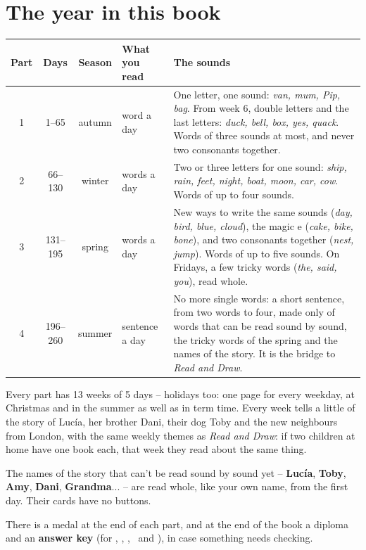 \section*{The year in this book}

\begin{center}
\renewcommand{\arraystretch}{1.4}
\begin{tabularx}{\linewidth}{@{}c c c >{\raggedright\arraybackslash}p{27mm} >{\raggedright\arraybackslash}X@{}}
\toprule
\textbf{Part} & \textbf{Days} & \textbf{Season} & \textbf{What you read} & \textbf{The sounds} \\
\midrule
1 & 1--65    & autumn & 1 word a day     & One letter, one sound: \textit{van, mum, Pip, bag}. From week 6,
double letters and the last letters: \textit{duck, bell, box, yes, quack}. Words of three
sounds at most, and never two consonants together. \\
2 & 66--130  & winter & 2 words a day    & Two or three letters for one sound: \textit{ship, rain, feet, night,
boat, moon, car, cow}. Words of up to four sounds. \\
3 & 131--195 & spring & 3 words a day    & New ways to write the same sounds (\textit{day, bird, blue, cloud}),
the magic e (\textit{cake, bike, bone}), and two consonants together
(\textit{nest, jump}). Words of up to five sounds. On Fridays, a few
tricky words (\textit{the, said, you}), read whole. \\
4 & 196--260 & summer & 1 sentence a day & No more single words: a short sentence, from two words to four,
made only of words that can be read sound by sound, the tricky words of
the spring and the names of the story. It is the bridge to
\textit{Read and Draw}. \\
\bottomrule
\end{tabularx}
\end{center}

\vspace{6mm}
Every part has 13 weeks of 5 days -- holidays too: one page for every
weekday, at Christmas and in the summer as well as in term time. Every
week tells a little of the story of Lucía, her brother Dani, their dog
Toby and the new neighbours from London, with the same weekly themes as
\textit{Read and Draw}: if two children at home have one book each, that
week they read about the same thing.

\vspace{4mm}
The names of the story that can't be read sound by sound yet --
\textbf{Lucía}, \textbf{Toby}, \textbf{Amy}, \textbf{Dani},
\textbf{Grandma}... -- are read whole, like your own name, from the first
day. Their cards have no buttons.

\vspace{4mm}
There is a medal at the end of each part, and at the end of the book a
diploma and an \textbf{answer key} (for \lblAdivina, \lblUne,
\lblEncuentra, \lblPalmadas\ and \lblSiNo), in case something needs
checking.
\newpage
